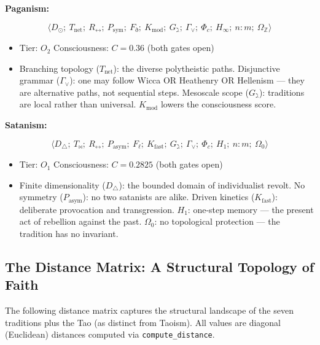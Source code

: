 \documentclass[12pt,a4paper]{article}
\begin{document}
\textbf{Paganism:}


\[\langle D_{\odot};\ T_\text{net};\ R_{\leftrightarrow};\ P_\text{sym};\ F_{\eth};\ K_\text{mod};\ G_{\gimel};\ \Gamma_{\vee};\ \Phi_c;\ H_{\infty};\ n{:}m;\ \Omega_\mathbb{Z} \rangle\]

\begin{itemize}
    \item Tier: $O_2$ \textbar{} Consciousness: $C = 0.36$ (both gates open)
    \item Branching topology ($T_\text{net}$): the diverse polytheistic paths. Disjunctive grammar ($\Gamma_{\vee}$): one may follow Wicca OR Heathenry OR Hellenism --- they are alternative paths, not sequential steps. Mesoscale scope ($G_{\gimel}$): traditions are local rather than universal. $K_\text{mod}$ lowers the consciousness score.
\end{itemize}

\textbf{Satanism:}


\[\langle D_{\triangle};\ T_{\bowtie};\ R_{\leftrightarrow};\ P_\text{asym};\ F_{\ell};\ K_\text{fast};\ G_{\gimel};\ \Gamma_{\vee};\ \Phi_c;\ H_1;\ n{:}m;\ \Omega_0 \rangle\]

\begin{itemize}
    \item Tier: $O_1$ \textbar{} Consciousness: $C = 0.2825$ (both gates open)
    \item Finite dimensionality ($D_{\triangle}$): the bounded domain of individualist revolt. No symmetry ($P_\text{asym}$): no two satanists are alike. Driven kinetics ($K_\text{fast}$): deliberate provocation and transgression. $H_1$: one-step memory --- the present act of rebellion against the past. $\Omega_0$: no topological protection --- the tradition has no invariant.
\end{itemize}

\subsection{The Distance Matrix: A Structural Topology of Faith}

The following distance matrix captures the structural landscape of the seven traditions plus the Tao (as distinct from Taoism). All values are diagonal (Euclidean) distances computed via \texttt{compute\_distance}.
\end{document}
